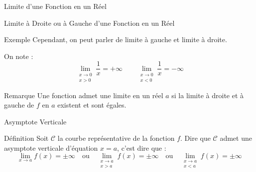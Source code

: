 \documentclass{coursbook}
\begin{document}
\begin{Gpartie}{Limite d'une Fonction en un Réel}
\begin{Spartie}{Limite à Droite ou à Gauche d'une Fonction en un Réel}
\begin{SSpartie}{Exemple}
                Cependant, on peut parler de limite à gauche et limite à droite.

                On note : \[\lim\limits_{\substack{x\to 0 \\ x>0}}\frac{1}{x}=+\infty\qquad\lim\limits_{\substack{x\to 0 \\ x<0}}\frac{1}{x}=-\infty\]
            \end{SSpartie}
            \begin{SSpartie}{Remarque} 
                Une fonction admet une limite en un réel $a$ si la limite à droite et à gauche de $f$ en $a$ existent et sont égales.
            \end{SSpartie}
        \end{Spartie}
        \begin{Spartie}{Asymptote Verticale} 
            \begin{SSpartie}{Définition} 
                Soit $\mathcal{C}$ la courbe représentative de la fonction $f$. Dire que $\mathcal{C}$ admet une asymptote verticale d'équation $x=a$, c'est dire que : \[\lim\limits_{x\to a}f(x)=\pm\infty\quad\text{ou}\quad\lim\limits_{\substack{x\to a \\ x>a}}f(x)=\pm\infty\quad\text{ou}\quad\lim\limits_{\substack{x\to a \\ x<a}}f(x)=\pm\infty\]
            \end{SSpartie}
        \end{Spartie}
    \end{Gpartie}
\end{document}
